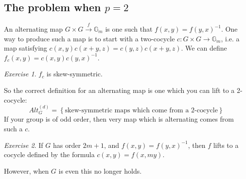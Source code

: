 \documentclass{article}
\renewcommand{\G}{{\mathbb{G}}}
\theoremstyle{definition} \newtheorem*{defn}{Definition}
\theoremstyle{plain} \newtheorem*{prop}{Proposition}
\theoremstyle{plain} \newtheorem*{lemma}{Lemma}
\theoremstyle{plain} \newtheorem*{cor}{Corollary}
\theoremstyle{remark} \newtheorem*{ex}{Example}
\theoremstyle{remark} \newtheorem*{exs}{Examples}
\theoremstyle{remark} \newtheorem*{nonex}{Non-example}
\theoremstyle{remark} \newtheorem*{rmk}{Remark}
\theoremstyle{remark} \newtheorem*{exc}{Exercise}
\theoremstyle{remark} \newtheorem*{idea}{Idea}
\theoremstyle{remark} \newtheorem*{obs}{Observation}
\theoremstyle{plain} \newtheorem*{theorem}{Theorem}
\theoremstyle{plain} \newtheorem*{conj}{Conjecture}
\theoremstyle{remark} \newtheorem*{q}{Question}
\theoremstyle{definition} \newtheorem*{fact}{Fact}
\theoremstyle{definition} \newtheorem*{facts}{Facts}
\theoremstyle{remark} \newtheorem*{ntn}{Notation}
\theoremstyle{remark} \newtheorem*{goal}{Goal}
\theoremstyle{remark} \newtheorem*{sketch}{Sketch}
\theoremstyle{definition} \newtheorem{claim}{Claim}
\begin{document}
\subsection{The problem when $ p = 2 $} 
An alternating map $ G \times G \xrightarrow{f} \G_m $ is one such that $ f(x, y) = f(y, x)^{-1} $. 
One way to produce such a map is to start with a two-cocycle $ c : G \times G \to \G_m $, i.e. a map satisfying $ c(x, y) c(x+y, z) = c(y, z)c(x+y, z) $. 
We can define $ f_c(x, y) = c(x,y) c(y, x)^{-1} $. 
\begin{exc}
	$ f_c $ is skew-symmetric.
\end{exc} 
So the correct definition for an alternating map is one which you can lift to a 2-cocycle:
\begin{equation*}
	Alt^{(d)}_G =\left\{\text{skew-symmetric maps which come from a 2-cocycle} \right\}
\end{equation*} 
If your group is of odd order, then very map which is alternating comes from such a $ c $. 
\begin{exc}
	If $ G $ has order $ 2m+1 $, and $ f(x, y) = f(y, x)^{-1} $, then $ f $ lifts to a cocycle defined by the formula $ c(x, y) = f(x, my) $. 
\end{exc}
However, when $ G $ is even this no longer holds. 
\end{document}
